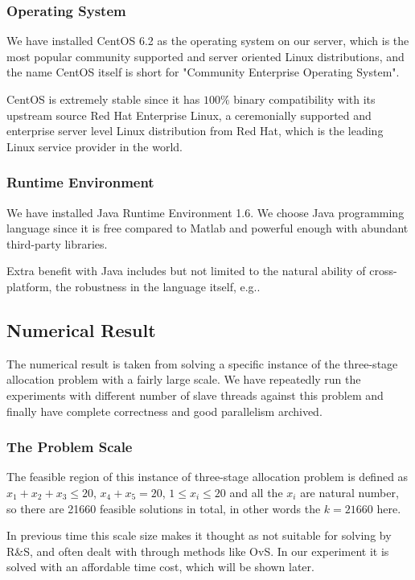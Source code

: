\documentclass[12pt,a4paper]{report}
\begin{document}
\subsubsection{Operating System}

We have installed CentOS 6.2 as the operating system on our server, which is the most popular community supported and server oriented Linux distributions, and the name CentOS itself is short for "Community Enterprise Operating System".

CentOS is extremely stable since it has $100\%$ binary compatibility with its upstream source Red Hat Enterprise Linux, a ceremonially supported and enterprise server level Linux distribution from Red Hat, which is the leading Linux service provider in the world. 

\subsubsection{Runtime Environment}

We have installed Java Runtime Environment 1.6. We choose Java programming language since it is free compared to Matlab and powerful enough with abundant third-party libraries.

Extra benefit with Java includes but not limited to the natural ability of cross-platform, the robustness in the language itself, e.g..

\subsection{Numerical Result}

The numerical result is taken from solving a specific instance of the three-stage allocation problem with a fairly large scale. We have repeatedly run the experiments with different number of slave threads against this problem and finally have complete correctness and good parallelism archived.

\subsubsection{The Problem Scale}

The feasible region of this instance of three-stage allocation problem is defined as $x_1 + x_2 + x_3 \leqslant 20$, $x_4 + x_5 = 20$, $1 \leqslant x_i \leqslant 20$ and all the $x_i$ are natural number, so there are 21660 feasible solutions in total, in other words the $k = 21660$ here.

In previous time this scale size makes it thought as not suitable for solving by R\&S, and often dealt with through methods like OvS. In our experiment it is solved with an affordable time cost, which will be shown later.
\end{document}
